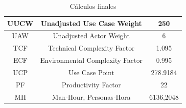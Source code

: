 \documentclass[12pt, a4paper, titlepage]{article}
\begin{document}
\begin{table}[h]
	\begin{center}
		\begin{tabular}{|c|c|c|}
			\hline
			UUCW & Unadjusted Use Case Weight & 250 \\ \hline
			UAW & Unadjusted Actor Weight & 6 \\ \hline
			TCF & Technical Complexity Factor & 1.095 \\ \hline
			ECF & Environmental Complexity Factor & 0.995 \\ \hline
			UCP & Use Case Point & 278.9184 \\ \hline
			PF &  Productivity Factor & 22 \\ \hline
			MH &  Man-Hour, Personas-Hora & 6136,2048 \\ \hline
			
		\end{tabular}
		\caption{Cálculos finales}
	\end{center}
\end{table}
\end{document}
